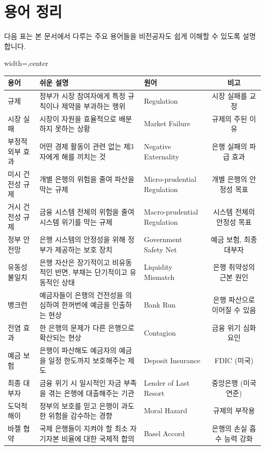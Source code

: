 \documentclass[11pt,a4paper]{book}
\theoremstyle{definition}
\begin{document}
\section{용어 정리}

다음 표는 본 문서에서 다루는 주요 용어들을 비전공자도 쉽게 이해할 수 있도록 설명합니다.

\begin{adjustbox}{width=\textwidth,center}
\begin{tabular}{lllc}
\toprule
\textbf{용어} & \textbf{쉬운 설명} & \textbf{원어} & \textbf{비고} \\
\midrule
규제 & 정부가 시장 참여자에게 특정 규칙이나 제약을 부과하는 행위 & Regulation & 시장 실패를 교정 \\
시장 실패 & 시장이 자원을 효율적으로 배분하지 못하는 상황 & Market Failure & 규제의 주된 이유 \\
부정적 외부 효과 & 어떤 경제 활동이 관련 없는 제3자에게 해를 끼치는 것 & Negative Externality & 은행 실패의 파급 효과 \\
미시 건전성 규제 & 개별 은행의 위험을 줄여 파산을 막는 규제 & Micro-prudential Regulation & 개별 은행의 안정성 목표 \\
거시 건전성 규제 & 금융 시스템 전체의 위험을 줄여 시스템 위기를 막는 규제 & Macro-prudential Regulation & 시스템 전체의 안정성 목표 \\
정부 안전망 & 은행 시스템의 안정성을 위해 정부가 제공하는 보호 장치 & Government Safety Net & 예금 보험, 최종 대부자 \\
유동성 불일치 & 은행 자산은 장기적이고 비유동적인 반면, 부채는 단기적이고 유동적인 상태 & Liquidity Mismatch & 은행 취약성의 근본 원인 \\
뱅크런 & 예금자들이 은행의 건전성을 의심하여 한꺼번에 예금을 인출하는 현상 & Bank Run & 은행 파산으로 이어질 수 있음 \\
전염 효과 & 한 은행의 문제가 다른 은행으로 확산되는 현상 & Contagion & 금융 위기 심화 요인 \\
예금 보험 & 은행이 파산해도 예금자의 예금을 일정 한도까지 보호해주는 제도 & Deposit Insurance & FDIC (미국) \\
최종 대부자 & 금융 위기 시 일시적인 자금 부족을 겪는 은행에 대출해주는 기관 & Lender of Last Resort & 중앙은행 (미국 연준) \\
도덕적 해이 & 정부의 보호를 믿고 은행이 과도한 위험을 감수하는 경향 & Moral Hazard & 규제의 부작용 \\
바젤 협약 & 국제 은행들이 지켜야 할 최소 자기자본 비율에 대한 국제적 합의 & Basel Accord & 은행의 손실 흡수 능력 강화 \\

\end{tabular}
\end{adjustbox}
\end{document}
